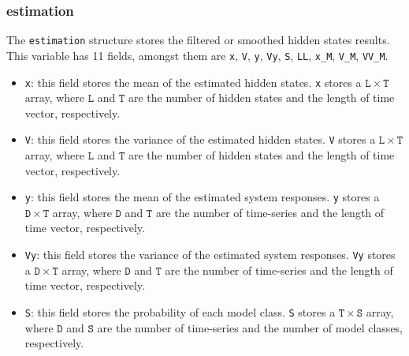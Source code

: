 \subsubsection{estimation} 
The \lstinline[basicstyle = \mlttfamily \small ]!estimation! structure stores the filtered or smoothed hidden states results.
This variable has 11 fields, amongst them  are \lstinline[basicstyle = \mlttfamily \small ]!x!, \lstinline[basicstyle = \mlttfamily \small ]!V!, \lstinline[basicstyle = \mlttfamily \small ]!y!, \lstinline[basicstyle = \mlttfamily \small ]!Vy!,  \lstinline[basicstyle = \mlttfamily \small ]!S!, \lstinline[basicstyle = \mlttfamily \small ]!LL!, \lstinline[basicstyle = \mlttfamily \small ]!x_M!, \lstinline[basicstyle = \mlttfamily \small ]!V_M!, \lstinline[basicstyle = \mlttfamily \small ]!VV_M!.

\begin{itemize}
\item \lstinline[basicstyle = \mlttfamily \small ]!x!: this field stores the mean of the estimated hidden states. \lstinline[basicstyle = \mlttfamily \small ]!x! stores a $\mathtt{L} \times \mathtt{T}$ array, where $\mathtt{L}$ and $\mathtt{T}$ are the number of hidden states and the length of time vector, respectively. 
\item \lstinline[basicstyle = \mlttfamily \small ]!V!: this field stores the variance of the estimated hidden states. \lstinline[basicstyle = \mlttfamily \small ]!V! stores a $\mathtt{L} \times \mathtt{T}$ array, where $\mathtt{L}$ and $\mathtt{T}$ are the number of hidden states and the length of time vector, respectively. 
\item \lstinline[basicstyle = \mlttfamily \small ]!y!: this field stores the mean of the estimated system responses. \lstinline[basicstyle = \mlttfamily \small ]!y! stores a $\mathtt{D} \times \mathtt{T}$ array, where $\mathtt{D}$ and $\mathtt{T}$ are the number of time-series and the length of time vector, respectively. 
\item \lstinline[basicstyle = \mlttfamily \small ]!Vy!: this field stores the variance of the estimated system responses. \lstinline[basicstyle = \mlttfamily \small ]!Vy! stores a $\mathtt{D} \times \mathtt{T}$ array, where $\mathtt{D}$ and $\mathtt{T}$ are the number of time-series and the length of time vector, respectively. 
\item \lstinline[basicstyle = \mlttfamily \small ]!S!: this field stores the probability of each model class. \lstinline[basicstyle = \mlttfamily \small ]!S! stores a $\mathtt{T} \times \mathtt{S}$ array, where $\mathtt{D}$ and $\mathtt{S}$ are the number of time-series and the number of model classes, respectively. 

\end{itemize}
